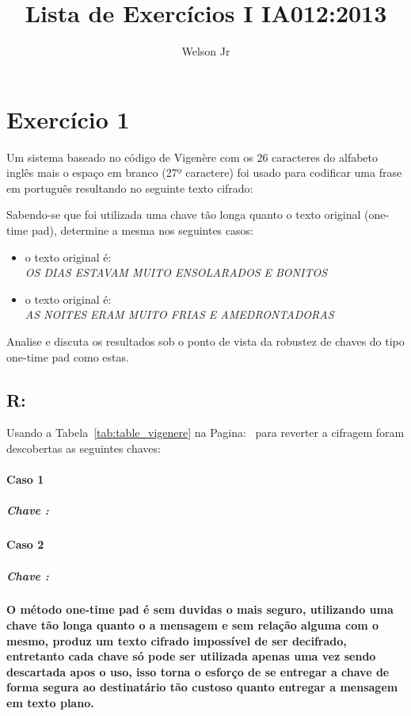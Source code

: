 \documentclass[10pt,a4paper]{article}
\author{Welson Jr}
\title{Lista de Exercícios I IA012:2013}
\begin{document}
\maketitle
\section*{Exercício 1}
Um sistema baseado no código de Vigenère com os 26 caracteres do alfabeto inglês mais o espaço em branco (27º caractere) foi usado para codificar uma frase em português resultando no seguinte texto cifrado:
\begin{center}
\end{center}
Sabendo-se que foi utilizada uma chave tão longa quanto o texto original (one-time pad), determine a mesma nos seguintes casos:
\begin{itemize}
\item o texto original é: \\ \emph{ OS DIAS ESTAVAM MUITO ENSOLARADOS E BONITOS }
\item o texto original é: \\ \emph{ AS NOITES ERAM MUITO FRIAS E AMEDRONTADORAS }
\end{itemize}
 Analise e discuta os resultados sob o ponto de vista da robustez de chaves do tipo one-time pad como estas.
\subsection*{R:}
Usando a Tabela~\ref{tab:table_vigenere} na Pagina:~\pageref{tab:table_vigenere} para reverter a cifragem foram descobertas as seguintes chaves:
\paragraph*{Caso 1}
\subparagraph*{Chave : }
\paragraph*{Caso 2}
\subparagraph*{Chave : }
\paragraph*{ O método one-time pad é sem duvidas o mais seguro, utilizando uma chave tão longa quanto o a mensagem e sem relação alguma com o mesmo, produz um texto cifrado impossível de ser decifrado, entretanto cada chave só pode ser utilizada apenas uma vez sendo descartada apos o uso, isso torna o esforço de se entregar a chave de forma segura ao destinatário tão custoso quanto entregar a mensagem em texto plano.  }
\end{document}

